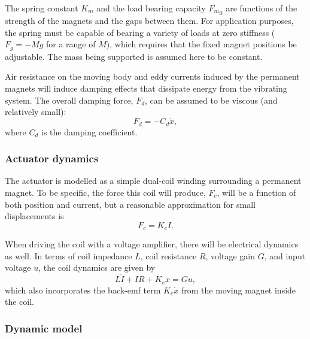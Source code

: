 The spring constant $K_m$ and the load bearing capacity ${F_m}_0$ are
functions of the strength of the magnets and the gaps between them. For
application purposes, the spring must be capable of bearing a variety
of loads at zero stiffness ($F_g=-Mg$ for a range of $M$), which
requires that the fixed magnet positions be adjustable. The mass being
supported is assumed here to be constant.

Air resistance on the moving body and eddy currents induced by the
permanent magnets will induce damping effects that dissipate energy
from the vibrating system. The overall damping force, $F_d$, can be
assumed to be viscous (and relatively small):
\begin{equation}
  F_d = -C_d\dot x ,
\end{equation}
where $C_d$ is the damping coefficient.

\subsubsection{Actuator dynamics}

The actuator is modelled as a simple dual-coil winding
surrounding a permanent magnet. To be specific, the force this coil
will produce, $F_c$, will be a function of both position and current, but a
reasonable approximation for small displacements is
\begin{equation}
  F_c = K_cI.
\end{equation}

When driving the coil with a voltage amplifier, there will be
electrical dynamics as well. In terms of coil impedance $L$, coil
resistance $R$, voltage gain $G$, and input voltage $u$, the coil
dynamics are given by
\begin{equation}
  L\dot I + IR + K_e\dot x = Gu,
\end{equation}
which also incorporates the back-emf term $K_e\dot x$ from the moving magnet
inside the coil.

\subsubsection{Dynamic model}

